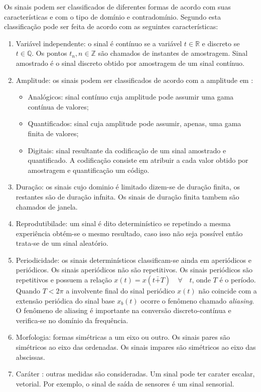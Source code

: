 Os sinais podem ser classificados de diferentes formas de acordo com suas características  e com o tipo de domínio e contradomínio. Segundo \cite{sig} esta classificação pode ser feita de acordo com as seguintes características:
\begin{enumerate}
\item Variável independente: o sinal é contínuo se a variável $t \in \mathbb{R}$ e discreto se $t \in \mathbb{Q}$. Os pontos $t_n, n \in \mathbb{Z}$ são chamados de instantes de amostragem. Sinal amostrado é o sinal discreto obtido por amostragem de um sinal contínuo.

\item Amplitude: os sinais podem ser classificados de acordo com a amplitude em :
\begin{itemize}
\item Analógicos: sinal contínuo cuja amplitude pode assumir uma gama contínua de valores;
\item Quantificados: sinal cuja amplitude pode assumir, apenas, uma gama finita de valores;
\item Digitais: sinal resultante da codificação de um sinal amostrado e quantificado. A codificação consiste em atribuir a cada valor obtido por amostragem e quantificação  um código.
\end{itemize} 
\item Duração: os sinais cujo dominio é limitado dizem-se de duração finita, os restantes são de duração infnita. Os sinais de duração finita tambem são chamados de janela.
\item Reprodutibilade: um sinal é dito determinístico se repetindo a mesma experiência obtém-se o mesmo resultado, caso isso não seja possível  então trata-se de um sinal aleatório.
\item Periodicidade: os sinais determinísticos classificam-se ainda em aperiódicos e periódicos. Os sinais aperiódicos não são repetitivos. Os sinais periódicos são repetitivos e possuem a relação $x(t) = x(t \bar{+} T) \quad \forall \quad t$, onde $T$ é o período. Quando $T < 2 \pi$ a involvente final do sinal periódico $x(t)$ não coincide com a extensão periódica do sinal base $x_b(t)$ ocorre o fenômeno chamado \textit{aliasing}. O fenômeno de aliasing é importante na conversão discreto-contínua e verifica-se no domínio da frequência.
\item Morfologia: formas simétricas a um eixo ou outro. Os sinais pares são simétricos ao eixo das ordenadas. Os sinais impares são simétricos ao eixo das abscissas.
\item Caráter : outras medidas são consideradas. Um sinal pode ter carater escalar, vetorial. Por exemplo, o sinal de saída de sensores é um sinal sensorial.
\end{enumerate}

